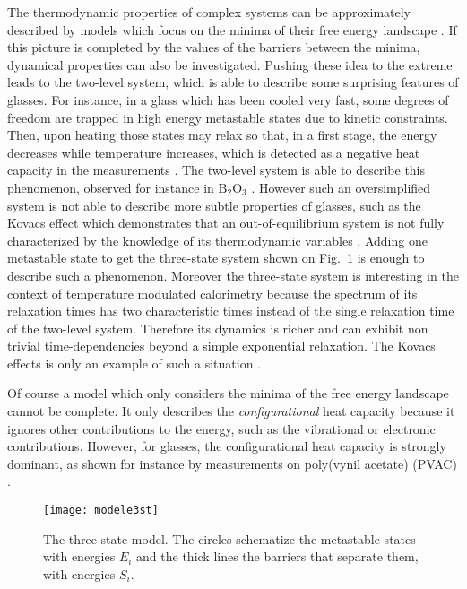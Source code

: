 \documentclass[pre,a4paper,twocolumn,superscriptaddress,%
floatfix]{revtex4}
\begin{document}
The thermodynamic properties of complex systems can be approximately described
by models which focus on the minima of their free energy landscape
\cite{STILLINGER-82}. If this picture is completed by the values of the
barriers between the minima, dynamical properties can also be
investigated. Pushing these idea to the extreme leads to the
  two-level 
system, which is able to describe some surprising features of glasses. For
instance, in a glass which has been cooled very fast, some degrees of freedom
are trapped in high energy metastable states due to kinetic constraints. Then,
upon heating those states may relax so that, in a first stage, the energy
decreases while temperature increases, which is detected as a negative
heat capacity in the measurements \cite{BISQUERT}. The two-level system is
able to describe this phenomenon, observed for instance in $\mathrm{B_2O_3}$
\cite{DEBOLT}. However such an oversimplified system is not able to describe
more subtle properties of glasses, such as the Kovacs effect which
demonstrates that an out-of-equilibrium system is not fully characterized by
the knowledge of its thermodynamic variables \cite{PG}. Adding one metastable
state to get the three-state system shown on Fig.~\ref{fig:model3st}
is enough to describe such a
phenomenon. Moreover the three-state system is interesting in the context of
temperature modulated calorimetry because the spectrum of its relaxation times
has two 
characteristic times instead of the single relaxation time of the two-level
system. Therefore its dynamics is richer and can exhibit non trivial
time-dependencies beyond a simple exponential relaxation. The Kovacs effects is
only an example of such a situation \cite{PG}.

Of course a model which only considers the minima of the free energy landscape
cannot be complete. It only describes the {\em configurational} heat capacity
because it ignores other contributions to the energy, such as the vibrational
or electronic contributions. However, for glasses, the configurational heat
capacity is strongly dominant, as shown for instance by measurements on
poly(vynil acetate) (PVAC) \cite{TOMBARI2007}.

\smallskip
\begin{figure}[h]
  \centering
  \texttt{[image: modele3st]}
  \caption{The three-state model. The circles schematize the metastable states
    with energies $E_i$ and the thick lines the barriers that separate them,
    with energies $S_i$.}
  \label{fig:model3st}
\end{figure}
\end{document}
